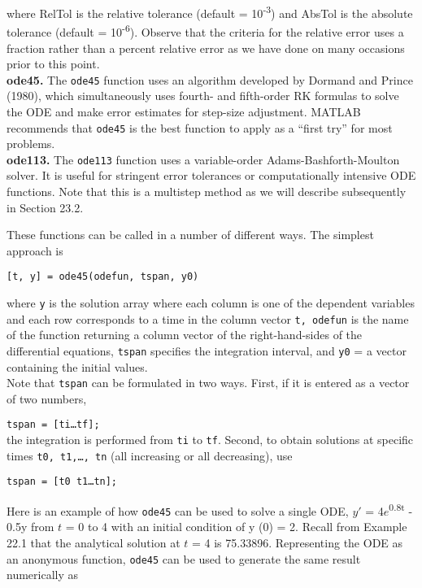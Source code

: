 \documentclass[../main.tex]{subfiles}
\begin{document}
where RelTol is the relative tolerance (default = 10\textsuperscript{-3}) and AbsTol is the absolute tolerance
(default = 10\textsuperscript{-6}). Observe that the criteria for the relative error uses a fraction rather than a
percent relative error as we have done on many occasions prior to this point.\\
\textbf{ode45.} The \texttt{ode45} function uses an algorithm developed by Dormand and Prince (1980),
which simultaneously uses fourth- and fifth-order RK formulas to solve the ODE and make
error estimates for step-size adjustment. MATLAB recommends that \texttt{ode45} is the best
function to apply as a ``first try'' for most problems.\\
\textbf{ode113.} The \texttt{ode113} function uses a variable-order Adams-Bashforth-Moulton solver. It
is useful for stringent error tolerances or computationally intensive ODE functions. Note
that this is a multistep method as we will describe subsequently in Section 23.2.

These functions can be called in a number of different ways. The simplest approach is
\begin{center}
    \texttt{[t, y] = ode45(odefun, tspan, y0)}
\end{center}
where \texttt{y} is the solution array where each column is one of the dependent variables and each
row corresponds to a time in the column vector \texttt{t, odefun} is the name of the function
returning a column vector of the right-hand-sides of the differential equations, \texttt{tspan} specifies the integration interval, and \texttt{y0} = a vector containing the initial values.\\
Note that \texttt{tspan} can be formulated in two ways. First, if it is entered as a vector of two numbers,

\texttt{tspan = [ti\ldots tf];}\\
the integration is performed from \texttt{ti} to \texttt{tf}. Second, to obtain solutions at specific times
\texttt{t0, t1,\ldots, tn} (all increasing or all decreasing), use

\texttt{tspan = [t0 t1\ldots tn];}

\noindent Here is an example of how \texttt{ode45} can be used to solve a single ODE, $y'$ =
4$e$\textsuperscript{0.8t} - 0.5y from $t$ = 0 to 4 with an initial condition of y (0) = 2. Recall from Example 22.1 that the analytical solution at $t$ = 4 is 75.33896. Representing the ODE as an
anonymous function, \texttt{ode45} can be used to generate the same result numerically as
\end{document}
